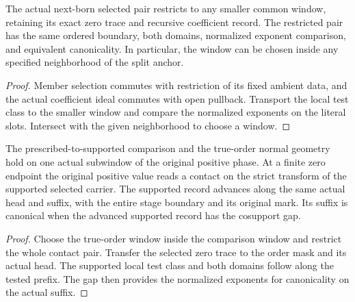 \begin{theorem}
\label{hir:g1-localized-born-window-restriction}
\leanok
The actual next-born selected pair restricts to any smaller
common window, retaining its exact zero trace and recursive
coefficient record. The restricted pair has the same ordered
boundary, both domains, normalized exponent comparison, and
equivalent canonicality. In particular, the window can be
chosen inside any specified neighborhood of the split anchor.
\end{theorem}
\begin{proof}
Member selection commutes with restriction of its fixed
ambient data, and the actual coefficient ideal commutes with
open pullback. Transport the local test class to the smaller
window and compare the normalized exponents on the literal
slots. Intersect with the given neighborhood to choose a window.
\end{proof}

\begin{theorem}
\label{hir:g1-common-born-zero-contact-read}
\leanok
The prescribed-to-supported comparison and the true-order normal
geometry hold on one actual subwindow of the original positive phase.
At a finite zero endpoint the original positive value reads a contact
on the strict transform of the supported selected carrier. The
supported record advances along the same actual head and suffix,
with the entire stage boundary and its original mark. Its suffix is
canonical when the advanced supported record has the cosupport gap.
\end{theorem}
\begin{proof}
Choose the true-order window inside the comparison window and restrict
the whole contact pair. Transfer the selected zero trace to the order
mask and its actual head. The supported local test class and both
domains follow along the tested prefix. The gap then provides the
normalized exponents for canonicality on the actual suffix.
\end{proof}

